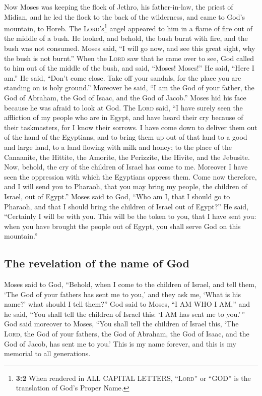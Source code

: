  Now Moses was keeping the flock of Jethro, his
father-in-law, the priest of Midian, and he led the flock to the back of
the wilderness, and came to God's mountain, to Horeb.  The
\textsc{Lord}'s\footnote{\textbf{3:2} When rendered in ALL CAPITAL
  LETTERS, ``\textsc{Lord}'' or ``GOD'' is the translation of God's
  Proper Name.} angel appeared to him in a flame of fire out of the
middle of a bush. He looked, and behold, the bush burnt with fire, and
the bush was not consumed.  Moses said, ``I will go now,
and see this great sight, why the bush is not burnt.'' 
When the \textsc{Lord} saw that he came over to see, God called to him
out of the middle of the bush, and said, ``Moses! Moses!'' He said,
``Here I am.''  He said, ``Don't come close. Take off your
sandals, for the place you are standing on is holy ground.''
 Moreover he said, ``I am the God of your father, the God
of Abraham, the God of Isaac, and the God of Jacob.'' Moses hid his face
because he was afraid to look at God.  The \textsc{Lord}
said, ``I have surely seen the affliction of my people who are in Egypt,
and have heard their cry because of their taskmasters, for I know their
sorrows.  I have come down to deliver them out of the hand
of the Egyptians, and to bring them up out of that land to a good and
large land, to a land flowing with milk and honey; to the place of the
Canaanite, the Hittite, the Amorite, the Perizzite, the Hivite, and the
Jebusite.  Now, behold, the cry of the children of Israel
has come to me. Moreover I have seen the oppression with which the
Egyptians oppress them.  Come now therefore, and I will
send you to Pharaoh, that you may bring my people, the children of
Israel, out of Egypt.''  Moses said to God, ``Who am I,
that I should go to Pharaoh, and that I should bring the children of
Israel out of Egypt?''  He said, ``Certainly I will be
with you. This will be the token to you, that I have sent you: when you
have brought the people out of Egypt, you shall serve God on this
mountain.''

\hypertarget{the-revelation-of-the-name-of-god}{%
\subsection{The revelation of the name of
God}\label{the-revelation-of-the-name-of-god}}

 Moses said to God, ``Behold, when I come to the children
of Israel, and tell them, `The God of your fathers has sent me to you,'
and they ask me, `What is his name?' what should I tell them?''
 God said to Moses, ``I AM WHO I AM,'' and he said, ``You
shall tell the children of Israel this: `I AM has sent me to you.'\,''
 God said moreover to Moses, ``You shall tell the
children of Israel this, `The \textsc{Lord}, the God of your fathers,
the God of Abraham, the God of Isaac, and the God of Jacob, has sent me
to you.' This is my name forever, and this is my memorial to all
generations.

